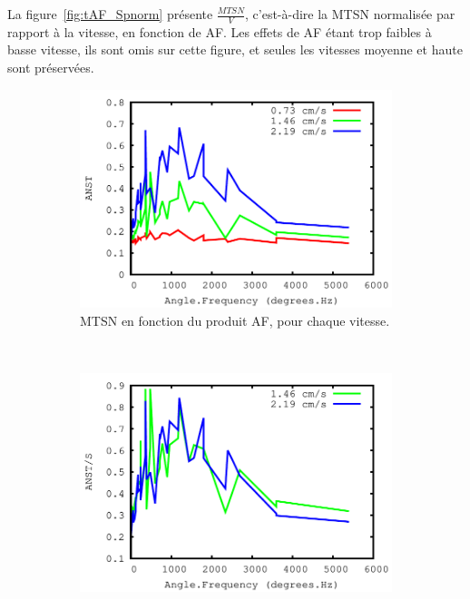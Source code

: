 	La figure~\ref{fig:tAF_Spnorm} présente $\frac{MTSN}{V}$, c'est-à-dire la MTSN normalisée par rapport à la vitesse, en fonction de AF. Les effets de AF étant trop faibles à basse vitesse, ils sont omis sur cette figure, et seules les vitesses moyenne et haute sont préservées.
	
	\begin{figure}[!htb]
		\begin{subfigure}[t]{0.49\textwidth}
			\centering
			\includegraphics[width=\textwidth]{figures/ch4/time_vs_AF_all_speeds}
			\caption{MTSN en fonction du produit AF, pour chaque vitesse.}
			\label{fig:tAFallSp}
		\end{subfigure}
		~
		\begin{subfigure}[t]{0.49\textwidth}
			\centering
			\includegraphics[width=\textwidth]{figures/ch4/time_vs_AF_all_speeds_normalized}

\end{subfigure}
\end{figure}
